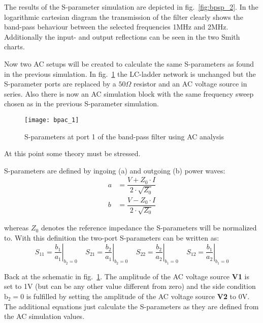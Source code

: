 The results of the S-parameter simulation are depicted in
fig.~\ref{fig:bpsp_2}.  In the logarithmic cartesian diagram the
transmission of the filter clearly shows the band-pass behaviour
between the selected frequencies 1MHz and 2MHz.  Additionally the
input- and output reflections can be seen in the two Smith charts.

\medskip

Now two AC setups will be created to calculate the same S-parameters
as found in the previous simulation.  In fig.~\ref{fig:bpac_1} the
LC-ladder network is unchanged but the S-parameter ports are replaced
by a $50\Omega$ resistor and an AC voltage source in series.  Also
there is now an AC simulation block with the same frequency sweep
chosen as in the previous S-parameter simulation.

\begin{figure}[ht]
  \centering
  \texttt{[image: bpac\_1]}
  \caption{S-parameters at port 1 of the band-pass filter using AC analysis}
  \label{fig:bpac_1}
\end{figure}
\FloatBarrier

At this point some theory must be stressed.

\medskip

S-parameters are defined by ingoing (a) and outgoing (b) power waves:
\begin{align*}
a &= \dfrac{V + Z_0\cdot I}{2 \cdot \sqrt{Z_0}}\\
b &= \dfrac{V - Z_0\cdot I}{2 \cdot \sqrt{Z_0}}
\end{align*}

whereas $Z_0$ denotes the reference impedance the S-parameters will be
normalized to.  With this definition the two-port S-parameters can be
written as:
\begin{equation*}
S_{11} = \left.\dfrac{b_1}{a_1}\right|_{b_2=0}\;\;\;\;
S_{21} = \left.\dfrac{b_2}{a_1}\right|_{b_2=0}\;\;\;\;
S_{22} = \left.\dfrac{b_2}{a_2}\right|_{b_1=0}\;\;\;\;
S_{12} = \left.\dfrac{b_1}{a_2}\right|_{b_1=0}
\end{equation*}

Back at the schematic in fig.~\ref{fig:bpac_1}.  The amplitude of the
AC voltage source \textbf{V1} is set to 1V (but can be any other value
different from zero) and the side condition $\mathrm{b_2=0}$ is
fulfilled by setting the amplitude of the AC voltage source
\textbf{V2} to 0V.  The additional equations just calculate the
S-parameters as they are defined from the AC simulation values.

